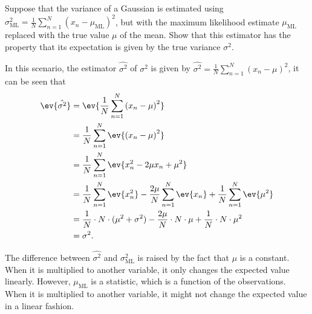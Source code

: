 \begin{question}{1.13}
	Suppose that the variance of a Gaussian is estimated using $\sigma^2_{\mathrm{ML}} = \frac{1}{N} \sum_{n=1}^{N} \left( x_n - \mu_{\mathrm{ML}} \right)^2$, but with the maximum likelihood estimate $\mu_{\mathrm{ML}}$ replaced with the true value $\mu$ of the mean. Show that this estimator has the property that its expectation is given by the true variance $\sigma^2$.
\end{question}

\begin{answer}{}
	In this scenario, the estimator $\hat{\sigma^2}$ of $\sigma^2$ is given by $\hat{\sigma^2} = \frac{1}{N} \sum_{n=1}^{N} \left( x_n - \mu \right)^2$, it can be seen that
	\begin{align}
		\ev{\hat{\sigma^2}} &= \ev{\frac{1}{N} \sum_{n=1}^{N} \left( x_n - \mu \right)^2}\\
		&= \frac{1}{N} \sum_{n=1}^{N} \ev{\left( x_n - \mu \right)^2}\\
		&= \frac{1}{N} \sum_{n=1}^{N} \ev{x_n^2 -2\mu x_n + \mu^2}\\
		&= \frac{1}{N} \sum_{n=1}^{N} \ev{x_n^2} -  \frac{2\mu}{N} \sum_{n=1}^{N} \ev{x_n} + \frac{1}{N} \sum_{n=1}^{N} \ev{\mu^2} \\
		&= \frac{1}{N} \cdot N \cdot (\mu^2 + \sigma^2) - \frac{2\mu}{N} \cdot N \cdot \mu + \frac{1}{N} \cdot N \cdot \mu^2\\
		&= \sigma^2.
	\end{align}
	
	The difference between $\hat{\sigma^2}$ and $\sigma^2_{\mathrm{ML}}$ is raised by the fact that $\mu$ is a constant. When it is multiplied to another variable, it only changes the expected value linearly. However, $\mu_{\mathrm{ML}}$ is a statistic, which is a function of the observations. When it is multiplied to another variable, it might not change the expected value in a linear fashion.
\end{answer}